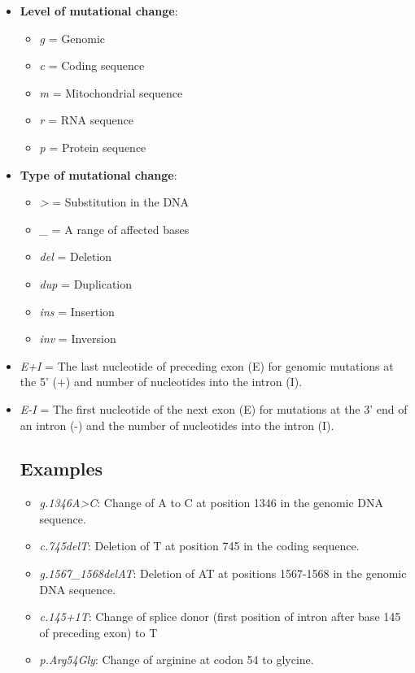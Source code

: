 \documentclass{inVerba-notes}
\begin{document}
\begin{itemize}
  \item \textbf{Level of mutational change}:
    \begin{itemize}
      \item \emph{g} = Genomic
      \item \emph{c} = Coding sequence
      \item \emph{m} = Mitochondrial sequence
      \item \emph{r} = RNA sequence
      \item \emph{p} = Protein sequence
    \end{itemize}
  \item \textbf{Type of mutational change}:
    \begin{itemize}
      \item \emph{>} = Substitution in the DNA
      \item \emph{\_} = A range of affected bases
      \item \emph{del} = Deletion
      \item \emph{dup} = Duplication
      \item \emph{ins} = Insertion
      \item \emph{inv} = Inversion
    \end{itemize}
  \item \emph{E+I} = The last nucleotide of preceding exon (E) for genomic mutations at the 5' (+) and number of nucleotides into the intron (I).
  \item \emph{E-I} = The first nucleotide of the next exon (E) for mutations at the 3' end of an intron (-) and the number of nucleotides into the intron (I).
  \subsection{Examples}
  \begin{itemize}
      \item \emph{g.1346A>C}: Change of A to C at position 1346 in the genomic DNA sequence.
      \item \emph{c.745delT}: Deletion of T at position 745 in the coding sequence.
      \item \emph{g.1567\_1568delAT}: Deletion of AT at positions 1567-1568 in the genomic DNA sequence.
      \item \emph{c.145+1T}: Change of splice donor (first position of intron after base 145 of preceding exon) to T
      \item \emph{p.Arg54Gly}: Change of arginine at codon 54 to glycine.
  \end{itemize}
\end{itemize}

\end{document}
